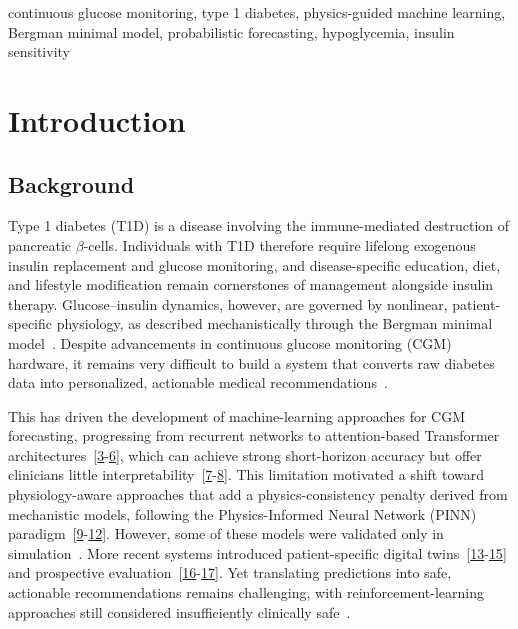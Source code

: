 \documentclass[journal]{IEEEtran}
\begin{document}
\begin{IEEEkeywords}
continuous glucose monitoring, type 1 diabetes, physics-guided machine learning, Bergman minimal model, probabilistic forecasting, hypoglycemia, insulin sensitivity
\end{IEEEkeywords}

\section{Introduction}

\subsection{Background}

Type 1 diabetes (T1D) is a disease involving the immune-mediated destruction of pancreatic $\beta$-cells. Individuals with T1D therefore require lifelong exogenous insulin replacement and glucose monitoring, and disease-specific education, diet, and lifestyle modification remain cornerstones of management alongside insulin therapy. Glucose--insulin dynamics, however, are governed by nonlinear, patient-specific physiology, as described mechanistically through the Bergman minimal model~\cite{ref1}. Despite advancements in continuous glucose monitoring (CGM) hardware, it remains very difficult to build a system that converts raw diabetes data into personalized, actionable medical recommendations~\cite{ref2}.

This has driven the development of machine-learning approaches for CGM forecasting, progressing from recurrent networks to attention-based Transformer architectures~[\hyperref[ref19label]{3}-\hyperref[ref22label]{6}], which can achieve strong short-horizon accuracy but offer clinicians little interpretability~[\hyperref[ref3label]{7}-\hyperref[ref5label]{8}]. This limitation motivated a shift toward physiology-aware approaches that add a physics-consistency penalty derived from mechanistic models, following the Physics-Informed Neural Network (PINN) paradigm~[\hyperref[ref8label]{9}-\hyperref[ref12label]{12}]. However, some of these models were validated only in simulation~\cite{ref9}. More recent systems introduced patient-specific digital twins~[\hyperref[ref13label]{13}-\hyperref[ref16label]{15}] and prospective evaluation~[\hyperref[ref17label]{16}-\hyperref[ref18label]{17}]. Yet translating predictions into safe, actionable recommendations remains challenging, with reinforcement-learning approaches still considered insufficiently clinically safe~\cite{ref6}.
\end{document}
